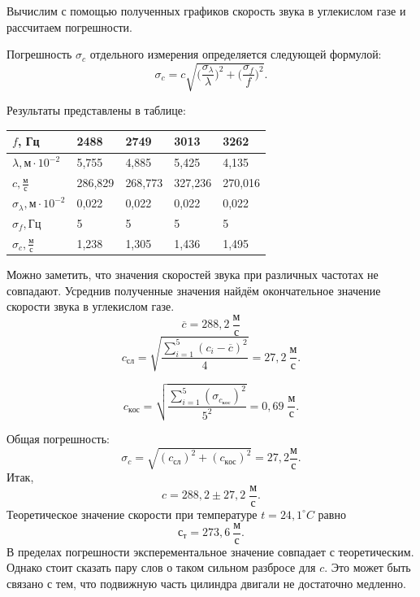 \documentclass[a4paper, 12pt]{article} %
\begin{document}
        Вычислим с помощью полученных графиков скорость звука в углекислом газе и рассчитаем погрешности.
        
        Погрешность $\sigma_{c}$ отдельного измерения определяется следующей формулой:
        $$ \sigma_{c} =c \sqrt{\Big(\frac{\sigma_{\lambda}}{\lambda}\Big)^2+ \Big(\frac{\sigma_{f}}{f}\Big)^2}.$$
        
        Результаты представлены в таблице:
        \begin{center}
        \begin{tabular}{|l|l|l|l|l|}
            \hline
            $f$, Гц & 2488 & 2749 & 3013 & 3262
            \\
            
            \hline
            $\lambda,{\text{м}} \cdot 10^{-2} $ & 5,755 & 4,885 & 5,425 & 4,135
            \\
            \hline
            $c,\frac{\text{м}}{\text{с}}$ & 286,829 & 268,773 & 327,236 & 270,016 
            \\
            \hline
            $\sigma_{\lambda},{\text{м}} \cdot 10^{-2} $ & 0,022 & 0,022 & 0,022 & 0,022
            \\
            \hline
            $\sigma_{f},{\text{Гц}}$ & 5 & 5 & 5 & 5 
            \\
            \hline
            $\sigma_{c},\frac{\text{м}}{\text{с}}$ & 1,238 & 1,305 & 1,436 & 1,495
            \\
            \hline
        \end{tabular}
        \end{center}
        Можно заметить, что значения скоростей звука при различных частотах не совпадают.
        Усреднив полученные значения найдём окончательное значение скорости звука в углекислом газе. 
        $$\overline{c} = 288,2 \:\frac{\text{м}}{\text{с}}$$
        $$c_{сл} = \sqrt{\frac{\sum_{i=1}^{5} (c_{i}-\overline{c})^2}{4}} = 27,2 \: \frac{\text{м}}{\text{с}}.$$
        
        $$ c_{кос} = \sqrt{\frac{\sum_{i=1}^{5} (\sigma_{c_{кос}})^2}{5^2}} = 0,69 \; \frac{\text{м}}{\text{с}}.$$
        
        Общая погрешность: $$\sigma_{c} = \sqrt{(c_{\text{сл}})^2+(c_{кос})^2} = 27,2\frac{\text{м}}{\text{с}}.$$
        Итак, $$c = 288,2 \pm 27,2 \; \frac{\text{м}}{\text{с}}.$$
        Теоретическое значение скорости при температуре $t = 24,1 ^\circ C$ равно $$с_{т} = 273,6 \: \frac{\text{м}}{\text{с}}.$$
        В пределах погрешности эксперементальное значение совпадает с теоретическим.
        Однако стоит сказать пару слов о таком сильном разбросе для $c$. Это может быть связано с тем, что подвижную часть цилиндра двигали не достаточно медленно.
        
\end{document}
